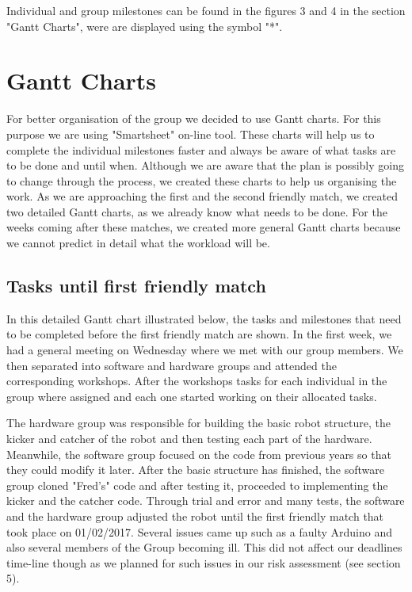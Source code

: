 \documentclass{article}
\begin{document}
Individual and group milestones can be found in the figures 3 and 4 in the
section "Gantt Charts", were are displayed using the symbol "*".

\section{Gantt Charts}
For better organisation of the group we decided to use Gantt charts. For this
purpose we are using "Smartsheet" on-line tool. These charts will help us to
complete the individual milestones faster and always be aware of what tasks are
to be done and until when. Although we are aware that the plan is possibly going
to change through the process, we created these charts to help us organising the
work. As we are approaching the first and the second friendly match, we created
two detailed Gantt charts, as we already know what needs to be done. For the
weeks coming after these matches, we created more general Gantt charts because
we cannot predict in detail what the workload will be.


\subsection{Tasks until first friendly match}
In this detailed Gantt chart illustrated below, the tasks and milestones that
need to be completed before the first friendly match are shown. In the first
week, we had a general meeting on Wednesday where we met with our group members.
We then separated into software and hardware groups and attended the
corresponding workshops. After the workshops tasks for each individual in the
group where assigned and each one started working on their allocated tasks.


The hardware group was responsible for building the basic robot structure, the
kicker and catcher of the robot and then testing each part of the hardware.
Meanwhile, the software group focused on the code from previous years so that
they could modify it later. After the basic structure has finished, the software
group cloned "Fred's" code and after testing it, proceeded to implementing the
kicker and the catcher code. Through trial and error and many tests, the
software and the hardware group adjusted the robot until the first friendly
match that took place on 01/02/2017. Several issues came up such as a faulty
Arduino and also several members of the Group becoming ill. This did not affect
our deadlines time-line though as we planned for such issues in our risk
assessment (see section 5).
\end{document}
